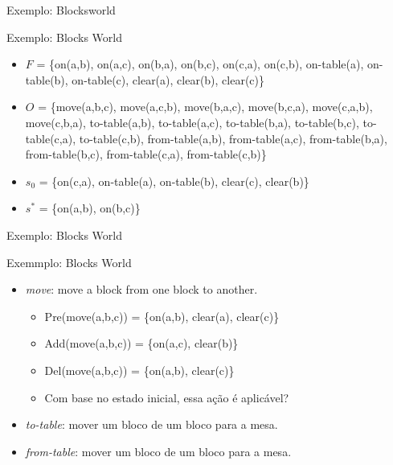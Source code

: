 \documentclass{beamer}
\begin{document}
\begin{frame}{Exemplo: Blocksworld}
    \begin{exampleblock}{\strut Exemplo: Blocks World}
      \begin{itemize}
      \item $F$ = \{on(a,b), on(a,c), on(b,a), on(b,c), on(c,a), on(c,b), on-table(a), on-table(b), on-table(c), clear(a), clear(b), clear(c)\}

       \item $O$ = \{move(a,b,c), move(a,c,b), move(b,a,c), move(b,c,a), move(c,a,b), move(c,b,a), to-table(a,b), to-table(a,c), to-table(b,a), to-table(b,c), to-table(c,a), to-table(c,b), from-table(a,b), from-table(a,c), from-table(b,a), from-table(b,c), from-table(c,a), from-table(c,b)\}

        \item $s_{0}$ = \{on(c,a), on-table(a), on-table(b), clear(c), clear(b)\}

         \item $s^{*}$ = \{on(a,b), on(b,c)\}
      \end{itemize}
    \end{exampleblock}
\end{frame}

\begin{frame}{Exemplo: Blocks World}
    \begin{exampleblock}{\strut Exemmplo: Blocks World}
      \begin{itemize}
      \item \emph{move}: move a block from one block to another.
      \begin{itemize}
        \item Pre(move(a,b,c)) = \{on(a,b), clear(a), clear(c)\}
        \item Add(move(a,b,c)) = \{on(a,c), clear(b)\}
        \item Del(move(a,b,c)) = \{on(a,b), clear(c)\}
        \item Com base no estado inicial, essa ação é aplicável? %
      \end{itemize}
      \item \emph{to-table}: mover um bloco de um bloco para a mesa.
      \item \emph{from-table}: mover um bloco de um bloco para a mesa.
      \end{itemize}
    \end{exampleblock}
\end{frame}
\end{document}
